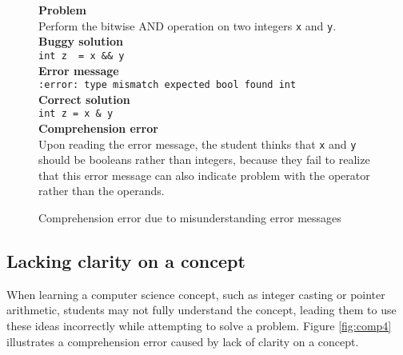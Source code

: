 \documentclass{sig-alternate}
\begin{document}
\begin{figure}
\begin{framed}
\setlength{\parindent}{0cm}
\textbf{Problem} \\
Perform the bitwise AND operation on two integers \texttt{x} and \texttt{y}.\\

\textbf{Buggy solution} \\
\verb|int z  = x && y|\\

\textbf{Error message}\\
\texttt{:error: type mismatch expected bool found int}\\

\textbf{Correct solution}\\
\verb|int z = x & y|\\

\textbf{Comprehension error}\\
Upon reading the error message, the student thinks that \texttt{x} and \texttt{y} should be booleans rather than integers, because they fail to realize that this error message can also indicate problem with the operator rather than the operands.
\end{framed}
\caption{Comprehension error due to misunderstanding error messages}
\label{fig:comp3}
\end{figure}

\subsection{Lacking clarity on a concept}
When learning a computer science concept, such as integer casting or pointer arithmetic, students may not fully understand the concept, leading them to use these ideas incorrectly while attempting to solve a problem. Figure \ref{fig:comp4} illustrates a comprehension error caused by lack of clarity on a concept.
\end{document}
